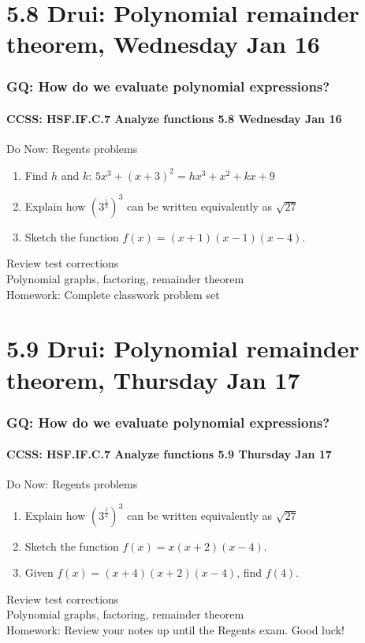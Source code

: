 \documentclass{beamer}
\begin{document}
  \section{5.8 Drui: Polynomial remainder theorem, Wednesday Jan 16}
    \frame
    {
      \frametitle{GQ: How do we evaluate polynomial expressions?}
      \framesubtitle{CCSS: HSF.IF.C.7 Analyze functions    \alert{5.8 Wednesday Jan 16}}

      \begin{block}{Do Now: Regents problems}
        \begin{enumerate}
          \item Find $h$ and $k$: $5x^3+(x+3)^2=hx^3+x^2+kx+9$
          \item Explain how $\displaystyle (3^{\frac{1}{2}})^3$ can be written equivalently as $\sqrt{27}$
          \item Sketch the function $f(x)=(x+1)(x-1)(x-4)$.
        \end{enumerate}
      \end{block}
      Review test corrections\\
      Polynomial graphs, factoring, remainder theorem \\ \bigskip
      Homework: Complete classwork problem set
    }

  \section{5.9 Drui: Polynomial remainder theorem, Thursday Jan 17}
    \frame
    {
      \frametitle{GQ: How do we evaluate polynomial expressions?}
      \framesubtitle{CCSS: HSF.IF.C.7 Analyze functions    \alert{5.9 Thursday Jan 17}}

      \begin{block}{Do Now: Regents problems}
        \begin{enumerate}
          \item Explain how $\displaystyle (3^{\frac{1}{2}})^3$ can be written equivalently as $\sqrt{27}$
          \item Sketch the function $f(x)=x(x+2)(x-4)$.
          \item Given $f(x)=(x+4)(x+2)(x-4)$, find $f(4)$.
        \end{enumerate}
      \end{block}
      Review test corrections\\
      Polynomial graphs, factoring, remainder theorem \\ \bigskip
      Homework: Review your notes up until the Regents exam. Good luck!
    }
\end{document}
